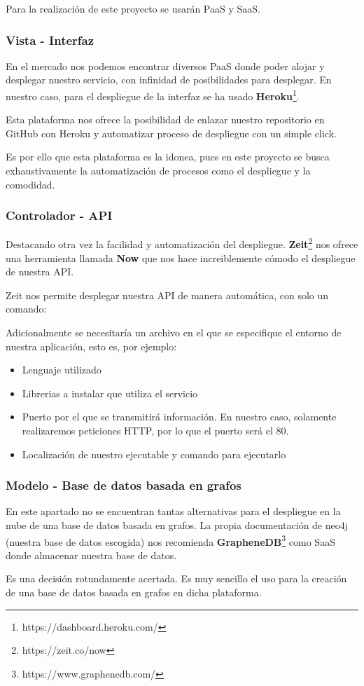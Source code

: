 Para la realización de este proyecto se usarán PaaS y SaaS.

\subsubsection{Vista - Interfaz}

En el mercado nos podemos encontrar diversos PaaS donde poder alojar y desplegar nuestro servicio, con infinidad de posibilidades para desplegar. En nuestro caso, para  el despliegue de la interfaz se ha usado \textbf{Heroku}\footnote{https://dashboard.heroku.com/}.

Esta plataforma nos ofrece la posibilidad de enlazar nuestro repositorio en GitHub con Heroku y automatizar proceso de despliegue con un simple click.

Es por ello que esta plataforma es la idonea, pues en este proyecto se busca exhaustivamente la automatización de procesos como el despliegue y la comodidad.

\subsubsection{Controlador - API}

Destacando otra vez la facilidad y automatización del despliegue. \textbf{Zeit}\footnote{https://zeit.co/now} nos ofrece una herramienta llamada \textbf{Now} que nos hace increiblemente cómodo el despliegue de nuestra API.

Zeit nos permite desplegar nuestra API de manera automática, con solo un comando: 

Adicionalmente se necesitaría un archivo en el que se especifique el entorno de nuestra aplicación, esto es, por ejemplo:

\begin{itemize}
    \item Lenguaje utilizado
    \item Librerias a instalar que utiliza el servicio
    \item Puerto por el que se transmitirá información. En nuestro caso, solamente realizaremos peticiones HTTP, por lo que el puerto será el 80.
    \item Localización de nuestro ejecutable y comando para ejecutarlo
\end{itemize}

\subsubsection{Modelo - Base de datos basada en grafos}

En este apartado no se encuentran tantas alternativas para el despliegue en la nube de una base de datos basada en grafos. La propia documentación de neo4j (nuestra base de datos escogida) nos recomienda \textbf{GrapheneDB}\footnote{https://www.graphenedb.com/} como SaaS donde almacenar nuestra base de datos.

Es una decisión rotundamente acertada. Es muy sencillo el uso para la creación de una base de datos basada en grafos en dicha plataforma.